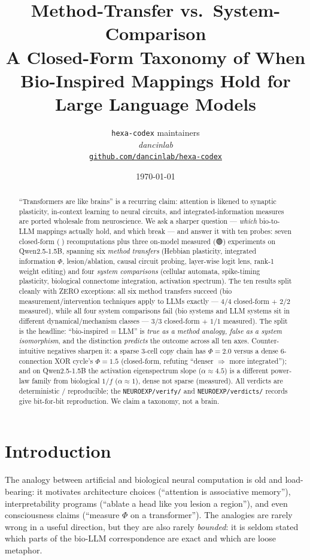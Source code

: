 \documentclass[11pt,a4paper]{article}
\title{
  \textbf{Method-Transfer vs.\ System-Comparison}\\[4pt]
  \large A Closed-Form Taxonomy of When Bio-Inspired Mappings Hold for Large Language Models
}
\author{
  \texttt{hexa-codex} maintainers\\
  \normalsize\textit{dancinlab}\\[2pt]
  \normalsize\href{https://github.com/dancinlab/hexa-codex}{\texttt{github.com/dancinlab/hexa-codex}}
}
\date{\today}
\providecommand{\tierBlue}{🔵}
\providecommand{\tierGreen}{🟢}
\begin{document}
\maketitle

\begin{abstract}
``Transformers are like brains'' is a recurring claim: attention is
likened to synaptic plasticity, in-context learning to neural circuits,
and integrated-information measures are ported wholesale from
neuroscience. We ask a sharper question --- \emph{which} bio-to-LLM
mappings actually hold, and which break --- and answer it with ten
probes: seven closed-form ($\tierBlue$) recomputations plus three
on-model measured ($\tierGreen$) experiments on Qwen2.5-1.5B, spanning
six \emph{method transfers} (Hebbian plasticity, integrated information
$\Phi$, lesion/ablation, causal circuit probing, layer-wise logit lens,
rank-1 weight editing) and four \emph{system comparisons} (cellular
automata, spike-timing plasticity, biological connectome integration,
activation spectrum). The ten results split cleanly with ZERO
exceptions: all six method transfers succeed (bio measurement/intervention
techniques apply to LLMs exactly --- $4/4$ closed-form $+$ $2/2$ measured),
while all four system comparisons fail (bio systems and LLM systems sit in
different dynamical/mechanism classes --- $3/3$ closed-form $+$ $1/1$
measured). The split is the headline: ``bio-inspired = LLM'' is
\emph{true as a method analogy, false as a system isomorphism}, and the
distinction \emph{predicts} the outcome across all ten axes. Counter-intuitive
negatives sharpen it: a sparse $3$-cell copy chain has $\Phi=2.0$ versus a
dense $6$-connection XOR cycle's $\Phi=1.5$ (closed-form, refuting
``denser $\Rightarrow$ more integrated''); and on Qwen2.5-1.5B the
activation eigenspectrum slope ($\alpha\!\approx\!4.5$) is a different
power-law family from biological $1/f$ ($\alpha\!\approx\!1$), dense not
sparse (measured). All verdicts are deterministic / reproducible; the
\texttt{NEUROEXP/verify/} and \texttt{NEUROEXP/verdicts/} records give
bit-for-bit reproduction. We claim a taxonomy, not a brain.
\end{abstract}

\section{Introduction}
\label{sec:intro}

The analogy between artificial and biological neural computation is old
and load-bearing: it motivates architecture choices (``attention is
associative memory''), interpretability programs (``ablate a head like
you lesion a region''), and even consciousness claims (``measure $\Phi$
on a transformer''). The analogies are rarely wrong in a useful
direction, but they are also rarely \emph{bounded}: it is seldom stated
which parts of the bio-LLM correspondence are exact and which are
loose metaphor.
\end{document}
